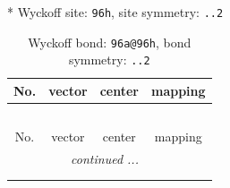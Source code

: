 \documentclass[fleqn,8pt]{jsarticle}
\begin{document}
* Wyckoff site: {\tt 96h}, site symmetry: {\tt ..2}
\renewcommand{\arraystretch}{1.2}
\begin{longtable}{cccc}
\caption{Wyckoff bond: {\tt 96a@96h}, bond symmetry: {\tt ..2}}
 \\
 \hline \hline
No. & vector & center & mapping \\ \hline \endfirsthead

\multicolumn{3}{l}{\tablename\ \thetable{}} \\
 \hline \hline
No. & vector & center & mapping \\ \hline \endhead

 \hline \hline
\multicolumn{3}{r}{\footnotesize\it continued ...} \\ \endfoot

 \hline \hline
\multicolumn{3}{r}{} \\ \endlastfoot


\end{longtable}
\end{document}
